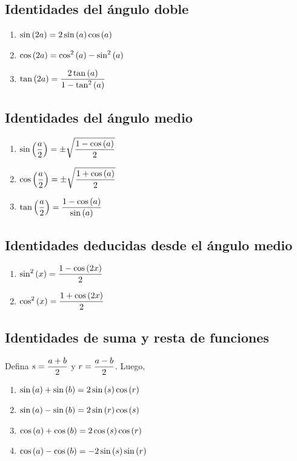 \documentclass[../../main.tex]{subfiles}
\begin{document}
    \subsection{Identidades del ángulo doble}
        \begin{enumerate}
        	\item $\displaystyle \sin\left( 2a \right) = 2 \sin\left( a \right) \cos\left( a \right)$
        	\item $\displaystyle \cos\left( 2a \right) = \cos^2\left( a \right) - \sin^2\left( a \right)$
        	\item $\displaystyle \tan\left( 2a \right) = \frac{2 \tan\left( a \right)}{1 - \tan^2\left( a \right)}$
        \end{enumerate}
    
    \subsection{Identidades del ángulo medio}
        \begin{enumerate}
        	\item $\displaystyle \sin\left( \frac a 2 \right) = \pm \sqrt{\frac{1 - \cos\left( a \right)} 2}$
        	\item $\displaystyle \cos\left( \frac a 2 \right) = \pm \sqrt{\frac{1 + \cos\left( a \right)} 2}$
        	\item $\displaystyle \tan\left( \frac a 2 \right) = \frac{1 - \cos\left( a \right)}{\sin\left( a \right)}$
        \end{enumerate}
        
    \subsection{Identidades deducidas desde el ángulo medio}
        \begin{enumerate}
        	\item $\displaystyle \sin^2\left( x \right) = \frac{1 - \cos\left( 2x \right)} 2$
        	\item $\displaystyle \cos^2\left( x \right) = \frac{1 + \cos\left( 2x \right)} 2$
        \end{enumerate}
        
    \subsection{Identidades de suma y resta de funciones}
        Defina $\displaystyle s = \frac{a+b}2$ y $\displaystyle r = \frac{a-b}2$. Luego, 
        \begin{enumerate}
        	\item $\displaystyle \sin\left( a \right) + \sin\left( b \right) = 2 \sin\left( s \right) \cos\left( r \right)$
        	\item $\displaystyle \sin\left( a \right) - \sin\left( b \right) = 2 \sin\left( r \right) \cos\left( s \right)$
        	\item $\displaystyle \cos\left( a \right) + \cos\left( b \right) = 2 \cos\left( s \right) \cos\left( r \right)$
        	\item $\displaystyle \cos\left( a \right) - \cos\left( b \right) = -2 \sin\left( s \right) \sin\left( r \right)$
        \end{enumerate}
        
\end{document}
